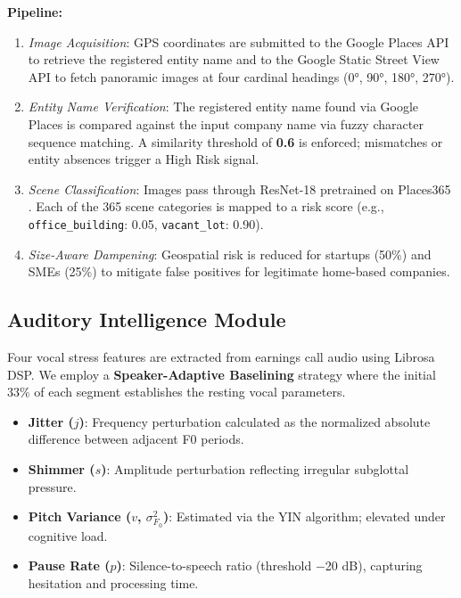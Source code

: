 \documentclass[conference]{IEEEtran}
\begin{document}
\textbf{Pipeline:}
\begin{enumerate}
  \item \emph{Image Acquisition}: GPS coordinates are submitted to the Google
        Places API to retrieve the registered entity name and to the Google
        Static Street View API to fetch panoramic images at four cardinal
        headings (0°, 90°, 180°, 270°).
  \item \emph{Entity Name Verification}: The registered entity name found via 
        Google Places is compared against the input company name via fuzzy 
        character sequence matching. A similarity threshold of \textbf{0.6} 
        is enforced; mismatches or entity absences trigger a High Risk signal.
  \item \emph{Scene Classification}: Images pass through ResNet-18 pretrained
        on Places365 \cite{zhou2017}. Each of the 365 scene categories is mapped
        to a risk score (e.g., \texttt{office\_building}: 0.05, 
        \texttt{vacant\_lot}: 0.90).
  \item \emph{Size-Aware Dampening}: Geospatial risk is reduced for startups
        (50\%) and SMEs (25\%) to mitigate false positives for legitimate
        home-based companies.
\end{enumerate}

\subsection{Auditory Intelligence Module}

Four vocal stress features are extracted from earnings call audio using Librosa 
DSP. We employ a \textbf{Speaker-Adaptive Baselining} strategy where the 
initial 33\% of each segment establishes the resting vocal parameters.

\begin{itemize}
  \item \textbf{Jitter ($j$)}: Frequency perturbation calculated as the 
        normalized absolute difference between adjacent F0 periods.
  \item \textbf{Shimmer ($s$)}: Amplitude perturbation reflecting irregular 
        subglottal pressure.
  \item \textbf{Pitch Variance ($v$, $\sigma^2_{F_0}$)}: Estimated via the YIN 
        algorithm; elevated under cognitive load.
  \item \textbf{Pause Rate ($p$)}: Silence-to-speech ratio (threshold $-$20 dB), 
        capturing hesitation and processing time.
\end{itemize}
\end{document}
